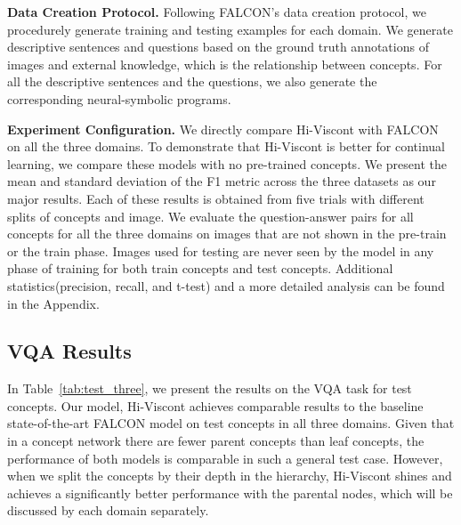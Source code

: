 \noindent\textbf{Data Creation Protocol.} Following FALCON's data creation protocol, we procedurely generate training and testing examples for each domain. 
We generate descriptive sentences and questions based on the ground truth annotations of images and external knowledge, which is the relationship between concepts.
For all the descriptive sentences and the questions, we also generate the corresponding neural-symbolic programs.

\noindent\textbf{Experiment Configuration.}
We directly compare Hi-Viscont with FALCON on all the three domains.
To demonstrate that Hi-Viscont is better for continual learning, we compare these models with no pre-trained concepts.
We present the mean and standard deviation of the F1 metric across the three datasets as our major results.
Each of these results is obtained from five trials with different splits of concepts and image.
We evaluate the question-answer pairs for all concepts for all the three domains on images that are not shown in the pre-train or the train phase. 
Images used for testing are never seen by the model in any phase of training for both train concepts and test concepts.
Additional statistics(precision, recall, and t-test) and a more detailed analysis can be found in the Appendix.


\begin{table}[H]
\caption{The average F1 score and standard deviation of Hi-Viscont (HV) and FALCON (FCN) on the CUB dataset by the depth of concepts in the hierarchy.}
\label{tab:CUB_depth}
\end{table}

\subsection{VQA Results}
In Table~\ref{tab:test_three}, we present the results on the VQA task for test concepts.
Our model, Hi-Viscont achieves comparable results to the baseline state-of-the-art FALCON model on test concepts in all three domains.
Given that in a concept network there are fewer parent concepts than leaf concepts, the performance of both models is comparable in such a general test case.
However, when we split the concepts by their depth in the hierarchy, Hi-Viscont shines and achieves a significantly better performance with the parental nodes, which will be discussed by each domain separately.



